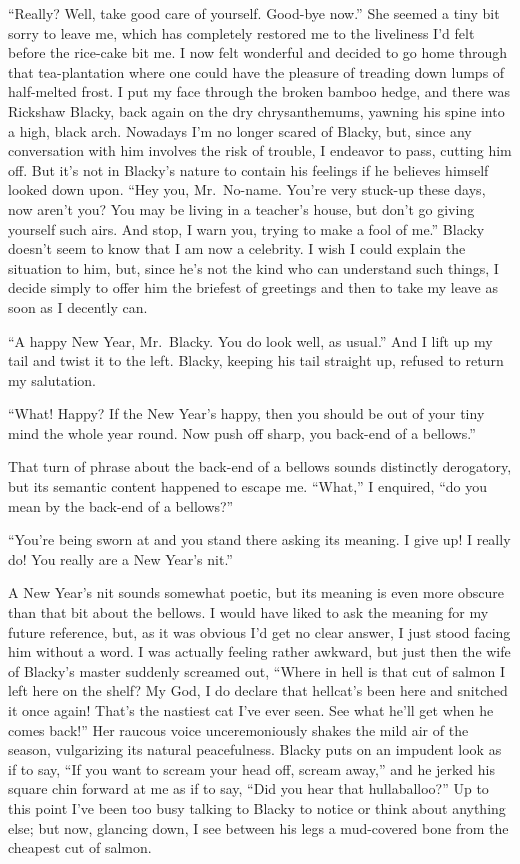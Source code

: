 \documentclass[12pt, openright]{book}
\begin{document}
``Really? Well, take good care of yourself. Good-bye now.'' She seemed a
tiny bit sorry to leave me, which has completely restored me to the
liveliness I'd felt before the rice-cake bit me. I now felt wonderful
and decided to go home through that tea-plantation where one could have
the pleasure of treading down lumps of half-melted frost. I put my face
through the broken bamboo hedge, and there was Rickshaw Blacky, back
again on the dry chrysanthemums, yawning his spine into a high, black
arch. Nowadays I'm no longer scared of Blacky, but, since any
conversation with him involves the risk of trouble, I endeavor to pass,
cutting him off. But it's not in Blacky's nature to contain his feelings
if he believes himself looked down upon. ``Hey you, Mr.~No-name. You're
very stuck-up these days, now aren't you? You may be living in a
teacher's house, but don't go giving yourself such airs. And stop, I
warn you, trying to make a fool of me.'' Blacky doesn't seem to know
that I am now a celebrity. I wish I could explain the situation to him,
but, since he's not the kind who can understand such things, I decide
simply to offer him the briefest of greetings and then to take my leave
as soon as I decently can.

``A happy New Year, Mr.~Blacky. You do look well, as usual.'' And I lift
up my tail and twist it to the left. Blacky, keeping his tail straight
up, refused to return my salutation.

``What! Happy? If the New Year's happy, then you should be out of your
tiny mind the whole year round. Now push off sharp, you back-end of a
bellows.''

That turn of phrase about the back-end of a bellows sounds distinctly
derogatory, but its semantic content happened to escape me. ``What,'' I
enquired, ``do you mean by the back-end of a bellows?''

``You're being sworn at and you stand there asking its meaning. I give
up! I really do! You really are a New Year's nit.''

A New Year's nit sounds somewhat poetic, but its meaning is even more
obscure than that bit about the bellows. I would have liked to ask the
meaning for my future reference, but, as it was obvious I'd get no clear
answer, I just stood facing him without a word. I was actually feeling
rather awkward, but just then the wife of Blacky's master suddenly
screamed out, ``Where in hell is that cut of salmon I left here on the
shelf? My God, I do declare that hellcat's been here and snitched it
once again! That's the nastiest cat I've ever seen. See what he'll get
when he comes back!'' Her raucous voice unceremoniously shakes the mild
air of the season, vulgarizing its natural peacefulness. Blacky puts on
an impudent look as if to say, ``If you want to scream your head off,
scream away,'' and he jerked his square chin forward at me as if to say,
``Did you hear that hullaballoo?'' Up to this point I've been too busy
talking to Blacky to notice or think about anything else; but now,
glancing down, I see between his legs a mud-covered bone from the
cheapest cut of salmon.
\end{document}
